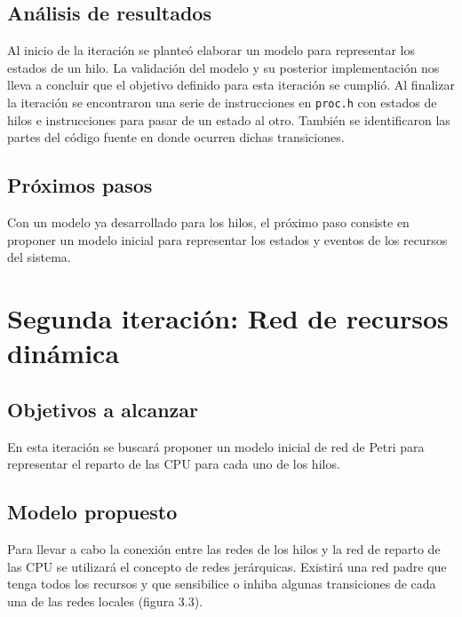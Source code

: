 \documentclass[a4paper]{book}
\begin{document}
\subsection{An\'alisis de resultados}
Al inicio de la iteraci\'on se plante\'o elaborar un modelo para representar los estados de un hilo. La validaci\'on del modelo y su posterior implementaci\'on nos lleva a concluir que el objetivo definido para esta iteraci\'on se cumpli\'o. Al finalizar la iteraci\'on se encontraron una serie de instrucciones en \verb|proc.h| con estados de hilos e instrucciones para pasar de un estado al otro. Tambi\'en se identificaron las partes del c\'odigo fuente en donde ocurren dichas transiciones.

\subsection{Pr\'oximos pasos}
Con un modelo ya desarrollado para los hilos, el pr\'oximo paso consiste en proponer un modelo inicial para representar los estados y eventos de los recursos del sistema.


\newpage
\section{Segunda iteraci\'on: Red de recursos din\'amica}

\subsection{Objetivos a alcanzar}
En esta iteraci\'on se buscar\'a proponer un modelo inicial de red de Petri para representar el reparto de las CPU para cada uno de los hilos.

\subsection{Modelo propuesto}
Para llevar a cabo la conexi\'on entre las redes de los hilos y la red de reparto de las CPU se utilizará el concepto de redes jer\'arquicas. Existir\'a una red padre que tenga todos los recursos y que sensibilice o inhiba algunas transiciones de cada una de las redes locales (figura 3.3).
\end{document}

